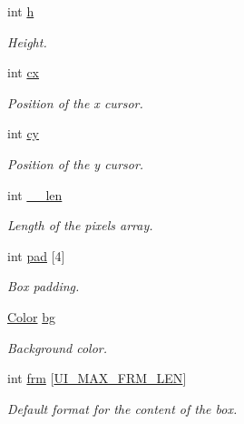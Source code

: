 \begin{DoxyCompactItemize}
$$int \hyperlink{struct__Ui__box_ab81930762400818df39bd6acc348d26f}{h}
\begin{DoxyCompactList}\small\item\em Height. \end{DoxyCompactList}\item 
\mbox{\label{struct__Ui__box_aa44d253872cfb9297e3fa71b93d9fc88}} 
int \hyperlink{struct__Ui__box_aa44d253872cfb9297e3fa71b93d9fc88}{cx}
\begin{DoxyCompactList}\small\item\em Position of the x cursor. \end{DoxyCompactList}\item 
\mbox{\label{struct__Ui__box_a993ecc3e3509632642cb403b731d9a6d}} 
int \hyperlink{struct__Ui__box_a993ecc3e3509632642cb403b731d9a6d}{cy}
\begin{DoxyCompactList}\small\item\em Position of the y cursor. \end{DoxyCompactList}\item 
\mbox{\label{struct__Ui__box_ade30a16b2e23d494a77767ce516f00d9}} 
int \hyperlink{struct__Ui__box_ade30a16b2e23d494a77767ce516f00d9}{\+\_\+\+\_\+len}
\begin{DoxyCompactList}\small\item\em Length of the pixels array. \end{DoxyCompactList}\item 
\mbox{\label{struct__Ui__box_a4030a2fd2487e5a4cde2b4fccc999166}} 
int \hyperlink{struct__Ui__box_a4030a2fd2487e5a4cde2b4fccc999166}{pad} \mbox{[}4\mbox{]}
\begin{DoxyCompactList}\small\item\em Box padding. \end{DoxyCompactList}\item 
\mbox{\label{struct__Ui__box_a2562527c18b6318ba537faae8dd2d06c}} 
\hyperlink{ui_8h_ab87bacfdad76e61b9412d7124be44c1c}{Color} \hyperlink{struct__Ui__box_a2562527c18b6318ba537faae8dd2d06c}{bg}
\begin{DoxyCompactList}\small\item\em Background color. \end{DoxyCompactList}\item 
\mbox{\label{struct__Ui__box_a47aa43df49f0d320c3a9a95faf11ff45}} 
int \hyperlink{struct__Ui__box_a47aa43df49f0d320c3a9a95faf11ff45}{frm} \mbox{[}\hyperlink{ui_8c_aab208380ff579bef5fd8b91fa0c0215a}{U\+I\+\_\+\+M\+A\+X\+\_\+\+F\+R\+M\+\_\+\+L\+EN}\mbox{]}
\begin{DoxyCompactList}\small\item\em Default format for the content of the box. \end{DoxyCompactList}\end{DoxyCompactItemize}


